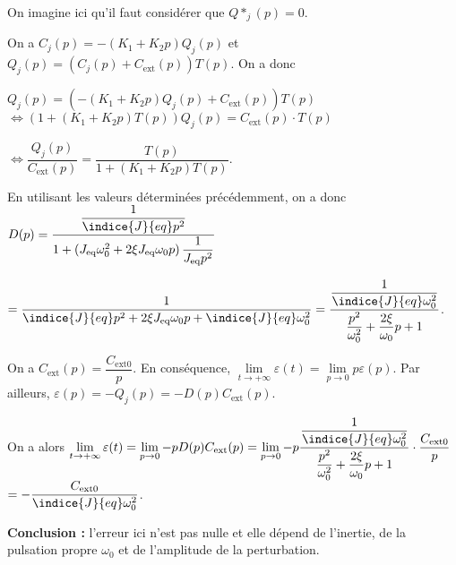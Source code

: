 \ifprof
\begin{corrige}
On imagine ici qu'il faut considérer que $Q*_j(p)=0$.

On a $C_j(p)=-\left(K_1+K_2 p\right) Q_j(p)$ et $Q_j(p)=\left(C_j(p)+C_{\text{ext}}(p)\right)T(p)$.  On a donc  



$Q_j(p)=\left(-\left(K_1+K_2 p\right) Q_j(p)+C_{\text{ext}}(p)\right)T(p)$
$\Leftrightarrow \left(1+\left(K_1+K_2 p\right)T(p) \right)Q_j(p)=C_{\text{ext}}(p)\cdot T(p)$

$\Leftrightarrow \dfrac{Q_j(p)}{C_{\text{ext}}(p)}=\dfrac{T(p)}{1+\left(K_1+K_2 p\right)T(p) }$.

En utilisant les valeurs déterminées précédemment, on a donc $D(p)=\dfrac{\dfrac{1}{\indice{J}{eq}p^2}}{1+\left(J_{\text{eq}}\omega_0^2+2\xi J_{\text{eq}}\omega_0 p\right)\dfrac{1}{J_{\text{eq}}p^2} }$

$=\dfrac{1}{\indice{J}{eq}p^2+2\xi J_{\text{eq}}\omega_0 p+\indice{J}{eq}\omega_0^2}=\dfrac{\dfrac{1}{\indice{J}{eq}\omega_0^2}}{\dfrac{p^2}{\omega_0^2}+\dfrac{2\xi}{\omega_0}p+1}$.

On a $C_{\text{ext}}(p)=\dfrac{C_{\text{ext} 0}}{p}$. En conséquence, 
$\lim\limits_{t\to +\infty} \varepsilon(t) = \lim\limits_{p\to 0} p\varepsilon(p)$.
Par ailleurs,  $\varepsilon(p)=-Q_j(p)=-D(p)C_{\text{ext}}(p)$.

On a alors $\lim\limits_{t\to +\infty} \varepsilon(t) = \lim\limits_{p\to 0} -pD(p)C_{\text{ext}}(p)= \lim\limits_{p\to 0} -p\dfrac{\dfrac{1}{\indice{J}{eq}\omega_0^2}}{\dfrac{p^2}{\omega_0^2}+\dfrac{2\xi}{\omega_0}p+1}\cdot \dfrac{C_{\text{ext0}}}{p}$
$=  -\dfrac{C_{\text{ext} 0}}{\indice{J}{eq}\omega_0^2}$.

\textbf{Conclusion :} l'erreur ici n'est pas nulle et elle dépend de l'inertie, de la pulsation propre $\omega_0$ et de l'amplitude de la perturbation. 
\end{corrige}
\else
\fi


